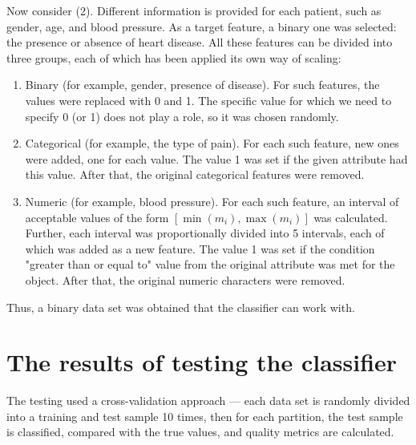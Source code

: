 \documentclass{article}
\begin{document}
Now consider (2). Different information is provided for each patient, such as gender, age, and blood pressure. As a target feature, a binary one was selected: the presence or absence of heart disease. All these features can be divided into three groups, each of which has been applied its own way of scaling:
\begin{enumerate}
    \item Binary (for example, gender, presence of disease). For such features, the values were replaced with 0 and 1. The specific value for which we need to specify 0 (or 1) does not play a role, so it was chosen randomly.
    \item Categorical (for example, the type of pain). For each such feature, new ones were added, one for each value. The value 1 was set if the given attribute had this value. After that, the original categorical features were removed.
    \item Numeric (for example, blood pressure). For each such feature, an interval of acceptable values of the form $[\min(m_i), \max(m_i)]$ was calculated. Further, each interval was proportionally divided into 5 intervals, each of which was added as a new feature. The value 1 was set if the condition "greater than or equal to" value from the original attribute was met for the object. After that, the original numeric characters were removed.
\end{enumerate}

Thus, a binary data set was obtained that the classifier can work with.

\section{The results of testing the classifier}

The testing used a cross-validation approach --- each data set is randomly divided into a training and test sample 10 times, then for each partition, the test sample is classified, compared with the true values, and quality metrics are calculated.
\end{document}
